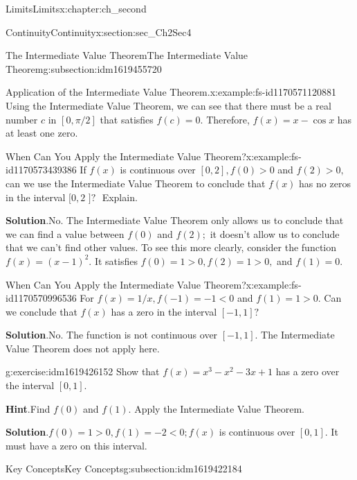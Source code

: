 \documentclass[oneside,10pt,]{book}
\newcommand{\blocktitlefont}{\relax}
\numberwithin{equation}{section}
\newcommand{\lt}{<}
\newcommand{\gt}{>}
\begin{document}
\begin{chapterptx}{Limits}{}{Limits}{}{}{x:chapter:ch_second}
\begin{sectionptx}{Continuity}{}{Continuity}{}{}{x:section:sec_Ch2Sec4}
\begin{subsectionptx}{The Intermediate Value Theorem}{}{The Intermediate Value Theorem}{}{}{g:subsection:idm1619455720}
\begin{example}{Application of the Intermediate Value Theorem.}{x:example:fs-id1170571120881}
Using the Intermediate Value Theorem, we can see that there must be a real number \(c\) in \([0,\pi/2]\) that satisfies \(f(c)=0.\) Therefore, \(f(x)=x-\cos  x\) has at least one zero.%
\end{example}
\begin{example}{When Can You Apply the Intermediate Value Theorem?}{x:example:fs-id1170573439386}%
If \(f(x)\) is continuous over \([0,2],f(0)\gt 0\) and \(f(2)\gt 0,\) can we use the Intermediate Value Theorem to conclude that \(f(x)\) has no zeros in the interval \([0,2\text{ ]? }\) Explain.%
\par\smallskip%
\noindent\textbf{\blocktitlefont Solution}.\hypertarget{g:solution:idm1619434856}{}\quad{}No. The Intermediate Value Theorem only allows us to conclude that we can find a value between \(f(0)\) and \(f(2);\) it doesn’t allow us to conclude that we can’t find other values. To see this more clearly, consider the function \(f(x)=(x-1)^2.\) It satisfies \(f(0)=1\gt 0,f(2)=1\gt 0,\) and \(f(1)=0.\)%
\end{example}
\begin{example}{When Can You Apply the Intermediate Value Theorem?}{x:example:fs-id1170570996536}%
For \(f(x)=1/x,f(-1)=-1\lt 0\) and \(f(1)=1\gt 0.\) Can we conclude that \(f(x)\) has a zero in the interval \([-1,1]?\)%
\par\smallskip%
\noindent\textbf{\blocktitlefont Solution}.\hypertarget{g:solution:idm1619427176}{}\quad{}No. The function is not continuous over \([-1,1].\) The Intermediate Value Theorem does not apply here.%
\end{example}
\begin{inlineexercise}{}{g:exercise:idm1619426152}%
Show that \(f(x)=x^3-x^2-3x+1\) has a zero over the interval \([0,1].\)%
\par\smallskip%
\noindent\textbf{\blocktitlefont Hint}.\hypertarget{g:hint:idm1619429224}{}\quad{}Find \(f(0)\) and \(f(1).\) Apply the Intermediate Value Theorem.%
\par\smallskip%
\noindent\textbf{\blocktitlefont Solution}.\hypertarget{g:solution:idm1619422312}{}\quad{}\(f(0)=1\gt 0,f(1)=-2\lt 0;f(x)\) is continuous over \([0,1].\) It must have a zero on this interval.%
\end{inlineexercise}%
\end{subsectionptx}
%
%
\typeout{************************************************}
\typeout{************************************************}
%
\begin{subsectionptx}{Key Concepts}{}{Key Concepts}{}{}{g:subsection:idm1619422184}

\end{subsectionptx}
\end{sectionptx}
\end{chapterptx}
\end{document}
